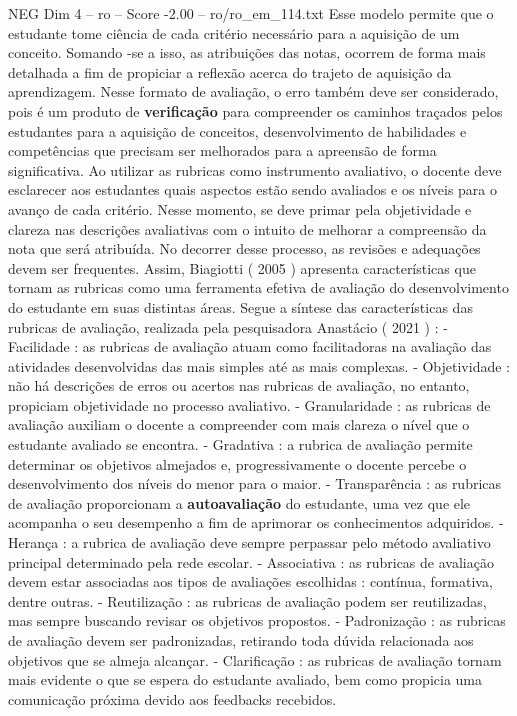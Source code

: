 \begin{textsample}{NEG Dim 4 – ro – Score -2.00 – ro/ro\_em\_114.txt}
Esse modelo permite que o estudante tome ciência de cada critério necessário para a aquisição de um conceito.
Somando -se a isso, as atribuições das notas, ocorrem de forma mais detalhada a fim de propiciar a reflexão acerca do trajeto de aquisição da aprendizagem.
Nesse formato de avaliação, o erro também deve ser considerado, pois é um produto de \textbf{verificação} para compreender os caminhos traçados pelos estudantes para a aquisição de conceitos, desenvolvimento de habilidades e competências que precisam ser melhorados para a apreensão de forma significativa.
Ao utilizar as rubricas como instrumento avaliativo, o docente deve esclarecer aos estudantes quais aspectos estão sendo avaliados e os níveis para o avanço de cada critério.
Nesse momento, se deve primar pela objetividade e clareza nas descrições avaliativas com o intuito de melhorar a compreensão da nota que será atribuída.
No decorrer desse processo, as revisões e adequações devem ser frequentes.
Assim, Biagiotti ( 2005 ) apresenta características que tornam as rubricas como uma ferramenta efetiva de avaliação do desenvolvimento do estudante em suas distintas áreas.
Segue a síntese das características das rubricas de avaliação, realizada pela pesquisadora Anastácio ( 2021 ) : - Facilidade : as rubricas de avaliação atuam como facilitadoras na avaliação das atividades desenvolvidas das mais simples até as mais complexas. - Objetividade : não há descrições de erros ou acertos nas rubricas de avaliação, no entanto, propiciam objetividade no processo avaliativo. - Granularidade : as rubricas de avaliação auxiliam o docente a compreender com mais clareza o nível que o estudante avaliado se encontra. - Gradativa : a rubrica de avaliação permite determinar os objetivos almejados e, progressivamente o docente percebe o desenvolvimento dos níveis do menor para o maior. - Transparência : as rubricas de avaliação proporcionam a \textbf{autoavaliação} do estudante, uma vez que ele acompanha o seu desempenho a fim de aprimorar os conhecimentos adquiridos. - Herança : a rubrica de avaliação deve sempre perpassar pelo método avaliativo principal determinado pela rede escolar. - Associativa : as rubricas de avaliação devem estar associadas aos tipos de avaliações escolhidas : contínua, formativa, dentre outras. - Reutilização : as rubricas de avaliação podem ser reutilizadas, mas sempre buscando revisar os objetivos propostos. - Padronização : as rubricas de avaliação devem ser padronizadas, retirando toda dúvida relacionada aos objetivos que se almeja alcançar. - Clarificação : as rubricas de avaliação tornam mais evidente o que se espera do estudante avaliado, bem como propicia uma comunicação próxima devido aos feedbacks recebidos.

\end{textsample}
